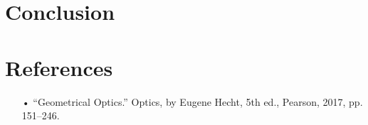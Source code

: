 \documentclass[12pt,letterpaper]{article}
\begin{document}

\section{Conclusion}


\section{References}
\begin{itemize}
\item[•]“Geometrical Optics.” Optics, by Eugene Hecht, 5th ed., Pearson, 2017, pp. 151–246.
\end{itemize}
\end{document}
